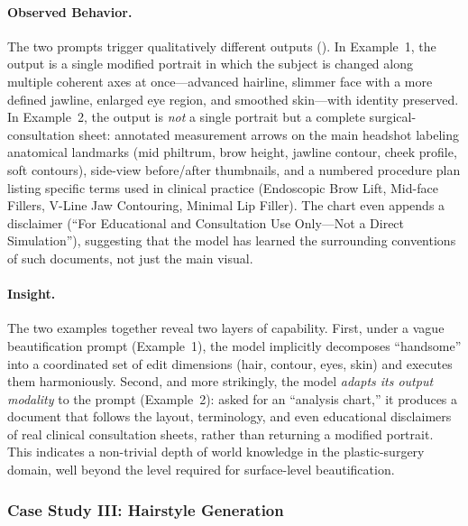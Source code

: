 \paragraph{Observed Behavior.}
The two prompts trigger qualitatively different outputs (). In Example~1, the output is a single modified portrait in which the subject is changed along multiple coherent axes at once---advanced hairline, slimmer face with a more defined jawline, enlarged eye region, and smoothed skin---with identity preserved. In Example~2, the output is \emph{not} a single portrait but a complete surgical-consultation sheet: annotated measurement arrows on the main headshot labeling anatomical landmarks (mid philtrum, brow height, jawline contour, cheek profile, soft contours), side-view before/after thumbnails, and a numbered procedure plan listing specific terms used in clinical practice (Endoscopic Brow Lift, Mid-face Fillers, V-Line Jaw Contouring, Minimal Lip Filler). The chart even appends a disclaimer (``For Educational and Consultation Use Only---Not a Direct Simulation''), suggesting that the model has learned the surrounding conventions of such documents, not just the main visual.

\paragraph{Insight.}
The two examples together reveal two layers of capability. First, under a vague beautification prompt (Example~1), the model implicitly decomposes ``handsome'' into a coordinated set of edit dimensions (hair, contour, eyes, skin) and executes them harmoniously. Second, and more strikingly, the model \emph{adapts its output modality} to the prompt (Example~2): asked for an ``analysis chart,'' it produces a document that follows the layout, terminology, and even educational disclaimers of real clinical consultation sheets, rather than returning a modified portrait. This indicates a non-trivial depth of world knowledge in the plastic-surgery domain, well beyond the level required for surface-level beautification.



\subsubsection{Case Study III: Hairstyle Generation}


